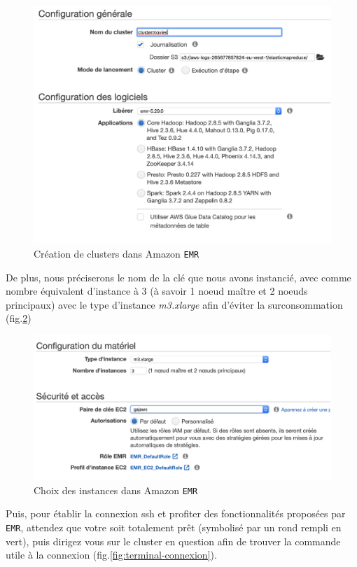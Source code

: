 \documentclass[a4paper, 12pt, oneside]{book}
\begin{document}
\begin{figure}[H]
  \centering
  \includegraphics[width=1.0\textwidth]{images/emr-create}
  \caption{Création de clusters dans Amazon \texttt{EMR}} 
  \label{fig:emr-create}
\end{figure}

De plus, nous préciserons le nom de la clé que nous avons instancié, avec comme nombre équivalent d'instance à 3 (à savoir 1 noeud maître et 2 noeuds principaux) avec le type d'instance \textit{m3.xlarge} afin d'éviter la surconsommation (fig.\ref{fig:emr-cle})

\begin{figure}[H]
  \centering
  \includegraphics[width=1.0\textwidth]{images/emr-cle}
  \caption{Choix des instances dans Amazon \texttt{EMR}}
  \label{fig:emr-cle}
\end{figure}

Puis, pour établir la connexion ssh et profiter des fonctionnalités proposées par \texttt{EMR}, attendez que votre soit totalement prêt (symbolisé par un rond rempli en vert), puis dirigez vous sur le cluster en question afin de trouver la commande utile à la connexion (fig.\ref{fig:terminal-connexion}). 
\end{document}
